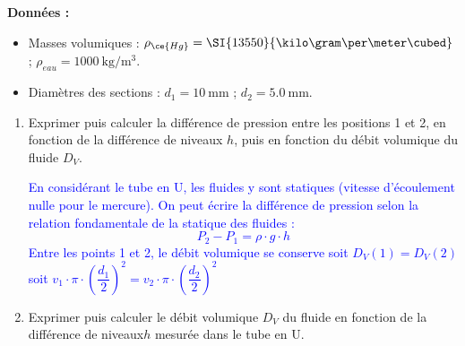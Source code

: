 \documentclass[a4paper,11pt,fleqn,usenames,dvipsnames]{article}%
\begin{document}
\textbf{Données :}
\begin{itemize}
	\item Masses volumiques : $\rho_{\ce{Hg}}=\SI{13550}{\kilo\gram\per\meter\cubed}$ ; $\rho_{eau}=\SI{1000}{\kilo\gram\per\meter\cubed}$.
	\item Diamètres des sections : $d_1=\SI{10}{\milli\meter}$ ; $d_2=\SI{5,0}{\milli\meter}$.
\end{itemize}
\begin{enumerate}
	\item Exprimer puis calculer la différence de pression entre les positions 1 et 2, en fonction de la différence de niveaux $h$, puis en fonction du débit volumique du fluide $D_V$.\\
	\textcolor{blue}{En considérant le tube en U, les fluides y sont statiques (vitesse d'écoulement nulle pour le mercure). On peut écrire la différence de pression selon la relation fondamentale de la statique des fluides : $$ P_2 - P_1 = \rho \cdot g \cdot h$$
	Entre les points 1 et 2, le débit volumique se conserve soit $D_V(1) = D_V(2)$ soit $v_1\cdot \pi\cdot \left(\dfrac{d_1}{2}\right)^2 =v_2\cdot \pi\cdot \left(\dfrac{d_2}{2}\right)^2$
	
	}
	\item Exprimer puis calculer le débit volumique $D_V$ du fluide en fonction de la différence de niveaux$h$ mesurée dans le tube en U.
\end{enumerate}
\end{document}
